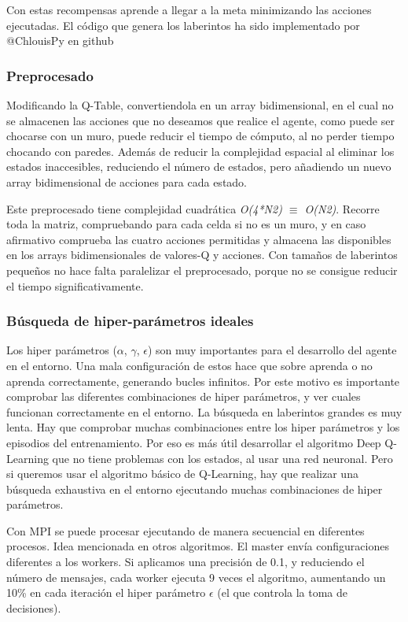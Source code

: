 		Con estas recompensas aprende a llegar a la meta minimizando las acciones ejecutadas. El código que genera los laberintos ha sido implementado por @ChlouisPy en github\cite{MazeGenerator}

	
		\subsubsection{Preprocesado}
		
			Modificando la Q-Table, convertiendola en un array bidimensional, en el cual no se almacenen las acciones que no deseamos que realice el agente, como puede ser chocarse con un muro, puede reducir el tiempo de cómputo, al no perder tiempo chocando con paredes. Además de reducir la complejidad espacial al eliminar los estados inaccesibles, reduciendo el número de estados, pero añadiendo un nuevo array bidimensional de acciones para cada estado. 
			
			Este preprocesado tiene complejidad cuadrática \textit{O(4*N2) $\equiv$ O(N2)}. Recorre toda la matriz, compruebando para cada celda si no es un muro, y en caso afirmativo comprueba las cuatro acciones permitidas y almacena las disponibles en los arrays bidimensionales de valores-Q y acciones. Con tamaños de laberintos pequeños no hace falta paralelizar el preprocesado, porque no se consigue reducir el tiempo significativamente.
			
		\subsubsection{Búsqueda de hiper-parámetros ideales}
		
			Los hiper parámetros ($\alpha$, $\gamma$, $\epsilon$) son muy importantes para el desarrollo del agente en el entorno. Una mala configuración de estos hace que sobre aprenda o no aprenda correctamente, generando bucles infinitos. Por este motivo es importante comprobar las diferentes combinaciones de hiper parámetros, y ver cuales funcionan correctamente en el entorno. La búsqueda en laberintos grandes es muy lenta. Hay que comprobar muchas combinaciones entre los hiper parámetros y los episodios del entrenamiento. Por eso es más útil desarrollar el algoritmo Deep Q-Learning que no tiene problemas con los estados, al usar una red neuronal. Pero si queremos usar el algoritmo básico de Q-Learning, hay que realizar una búsqueda exhaustiva en el entorno ejecutando muchas  combinaciones de hiper parámetros.
	
			Con MPI se puede procesar ejecutando de manera secuencial en diferentes procesos. Idea mencionada en otros algoritmos. El master envía configuraciones diferentes a los workers. Si aplicamos una precisión de 0.1, y reduciendo el número de mensajes, cada worker ejecuta 9 veces el algoritmo, aumentando un 10\% en cada iteración el hiper parámetro $\epsilon$ (el que controla la toma de decisiones). 
			
